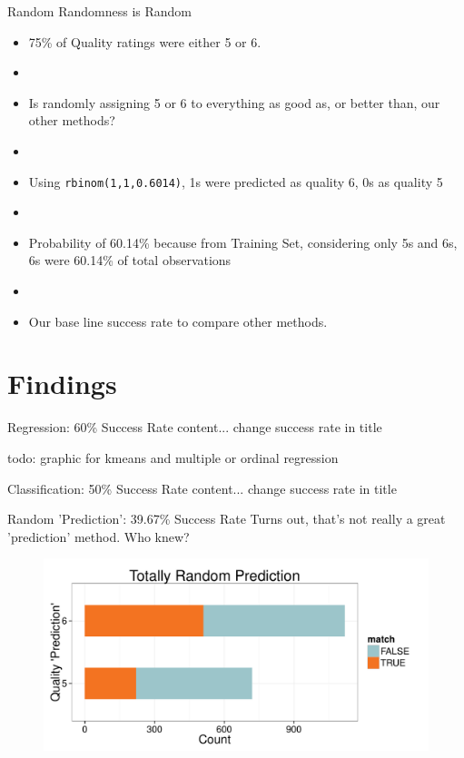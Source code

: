 \documentclass{beamer}
\begin{document}
\begin{frame}{Random Randomness is Random}
	\begin{itemize}
	\item 75\% of Quality ratings were either 5 or 6. 
	\item[]
	\item Is randomly assigning 5 or 6 to everything as good as, or better than, our other methods?
	\item[]
	\item Using \texttt{rbinom(1,1,0.6014)}, 1s were predicted as quality 6, 0s as quality 5
	\item[]
	\item Probability of 60.14\% because from Training Set, considering only 5s and 6s, 6s were 60.14\% of total observations
	\item[]
	\item Our base line success rate to compare other methods.
	\end{itemize}
\end{frame}


\section{Findings}

\begin{frame}{Regression: 60\% Success Rate}
content... change success rate in title


todo: graphic for kmeans and multiple or ordinal regression

\end{frame}

\begin{frame}{Classification: 50\% Success Rate}
content... change success rate in title
\end{frame}


\begin{frame}{Random 'Prediction': 39.67\% Success Rate}
	Turns out, that's not really a great 'prediction' method. Who knew?
	\begin{figure}
		\centering
		\includegraphics[width=\textwidth]{../images/RandomPrediction.pdf}
	\end{figure}
\end{frame}
\end{document}

